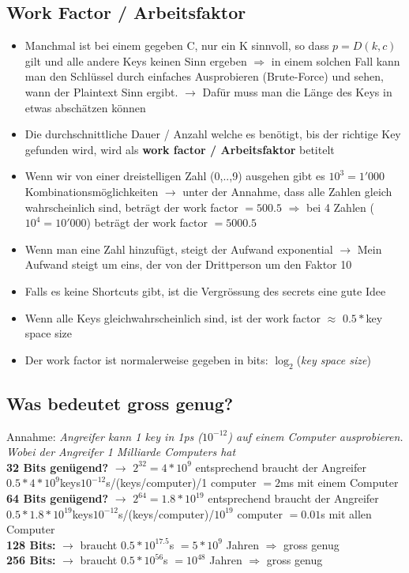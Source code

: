 \documentclass{report}
\theoremstyle{definition}
\theoremstyle{example}
\begin{document}
	\subsection{Work Factor / Arbeitsfaktor}
\begin{itemize}
	\item Manchmal ist bei einem gegeben C, nur ein K sinnvoll, so dass $p = D(k,c)$ gilt und alle andere Keys keinen Sinn ergeben $\Rightarrow$ in einem solchen Fall kann man den Schlüssel durch einfaches Ausprobieren (Brute-Force) und sehen, wann der Plaintext Sinn ergibt. $\rightarrow$ Dafür muss man die Länge des Keys in etwas abschätzen können
	\item Die durchschnittliche Dauer / Anzahl welche es benötigt, bis der richtige Key gefunden wird, wird als \textbf{work factor / Arbeitsfaktor} betitelt 
	\item Wenn wir von einer dreistelligen Zahl (0,..,9) ausgehen gibt es $10^3 = 1'000$ Kombinationsmöglichkeiten $\rightarrow$ unter der Annahme, dass alle Zahlen gleich wahrscheinlich sind, beträgt der work factor $= 500.5$ $\Rightarrow$ bei 4 Zahlen ($10^4 = 10'000$) beträgt der work factor $=5000.5$
	\item Wenn man eine Zahl hinzufügt, steigt der Aufwand exponential $\rightarrow$ Mein Aufwand steigt um eins, der von der Drittperson um den Faktor 10
	\item Falls es keine Shortcuts gibt, ist die Vergrössung des secrets eine gute Idee
	\item Wenn alle Keys gleichwahrscheinlich sind, ist der work factor $\approx$ $0.5*$key space size
	\item Der work factor ist normalerweise gegeben in bits: $\log_2$(\textit{key space size})
\end{itemize}

	\subsection{Was bedeutet gross genug?}
Annahme: \textit{Angreifer kann 1 key  in 1ps ($10^{-12}$) auf einem Computer ausprobieren. Wobei der Angreifer 1 Milliarde Computers hat}\\
\textbf{32 Bits genügend?} $\rightarrow$ $2^{32} = 4*10^9$ entsprechend braucht der Angreifer $0.5*4*10^9$keys$10^{-12}$s/(keys/computer)/1 computer $=2$ms mit einem Computer\\
\textbf{64 Bits genügend?} $\rightarrow$ $2^{64} = 1.8*10^{19}$ entsprechend braucht der Angreifer $0.5*1.8*10^{19}$keys$10^{-12}$s/(keys/computer)/$10^{19}$ computer $=0.01$s mit allen Computer\\
\textbf{128 Bits:} $\rightarrow$ braucht $0.5*10^{17.5}$s $=5*10^9$ Jahren $\Rightarrow$ gross genug\\
\textbf{256 Bits:} $\rightarrow$ braucht $0.5*10^{56}$s $=10^{48}$ Jahren $\Rightarrow$ gross genug
\end{document}
